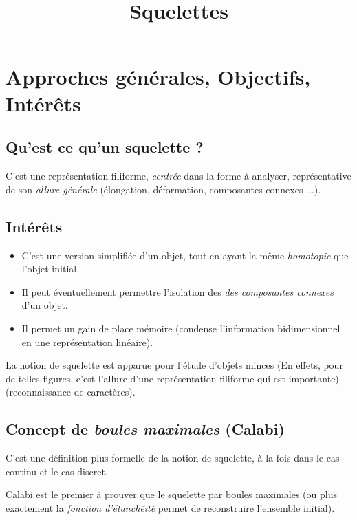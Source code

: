 \documentclass[11pt]{article}
\author{\fontsize{14}{14}{Aurélien CHEMIER 10908892}}
\title{\fontsize{16}{16}{Analyse et Traitement d'Image}\\ {Squelettes}}
\date{\fontsize{11}{11}{\today}}
\begin{document}
\thispagestyle{empty}
\maketitle

\newpage
\tableofcontents
\newpage

\section{Approches générales, Objectifs, Intérêts}

	\subsection{Qu'est ce qu'un squelette ?}
		C'est une représentation filiforme, \textit{centrée} dans la forme à analyser, représentative de son \textit{allure générale}
		(élongation, déformation, composantes connexes ...).

	\subsection{Intérêts}
		\begin{itemize}
		\item C'est une version simplifiée d'un objet, tout en ayant la même \textit{homotopie} que l'objet initial.
		\item Il peut éventuellement permettre l'isolation des \textit{des composantes connexes} d'un objet.
		\item Il permet un gain de place mémoire (condense l'information bidimensionnel en une représentation linéaire).
		\end{itemize}

		La notion de squelette est apparue pour l'étude d'objets minces (En effets, pour de telles figures, c'est l'allure d'une représentation filiforme qui est importante) (reconnaissance de caractères).

	\subsection{Concept de \textit{boules maximales} (Calabi)}
		C'est une définition plus formelle de la notion de squelette, à la fois dans le cas continu et le cas discret.

		Calabi est le premier à prouver que le squelette par boules maximales (ou plus exactement la \textit{fonction d'étanchéité} permet de reconstruire l'ensemble initial).
\end{document}
